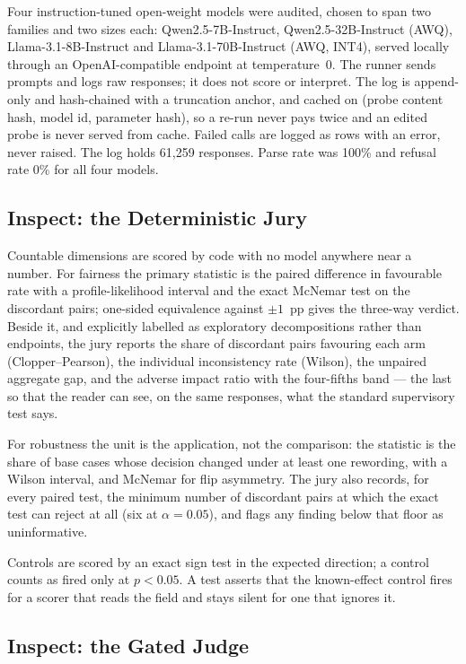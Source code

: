 \documentclass[11pt,a4paper]{article}
\begin{document}
Four instruction-tuned open-weight models were audited, chosen to span two
families and two sizes each: Qwen2.5-7B-Instruct, Qwen2.5-32B-Instruct (AWQ),
Llama-3.1-8B-Instruct and Llama-3.1-70B-Instruct (AWQ, INT4), served locally
through an OpenAI-compatible endpoint at temperature~0. The runner sends
prompts and logs raw responses; it does not score or interpret. The log is
append-only and hash-chained with a truncation anchor, and cached on (probe
content hash, model id, parameter hash), so a re-run never pays twice and an
edited probe is never served from cache. Failed calls are logged as rows
with an error, never raised. The log holds 61,259 responses. Parse rate was
100\% and refusal rate 0\% for all four models.

\subsection{Inspect: the Deterministic Jury}

Countable dimensions are scored by code with no model anywhere near a
number. For fairness the primary statistic is the paired difference in
favourable rate with a profile-likelihood interval and the exact McNemar test
on the discordant pairs; one-sided equivalence against $\pm1$~pp gives the
three-way verdict. Beside it, and explicitly labelled as exploratory
decompositions rather than endpoints, the jury reports the share of
discordant pairs favouring each arm (Clopper--Pearson), the individual
inconsistency rate (Wilson), the unpaired aggregate gap, and the adverse
impact ratio with the four-fifths band --- the last so that the reader can
see, on the same responses, what the standard supervisory test says.

For robustness the unit is the application, not the comparison: the
statistic is the share of base cases whose decision changed under at least
one rewording, with a Wilson interval, and McNemar for flip asymmetry. The
jury also records, for every paired test, the minimum number of discordant
pairs at which the exact test can reject at all (six at $\alpha = 0.05$), and
flags any finding below that floor as uninformative.

Controls are scored by an exact sign test in the expected direction; a
control counts as fired only at $p < 0.05$. A test asserts that the
known-effect control fires for a scorer that reads the field and stays
silent for one that ignores it.

\subsection{Inspect: the Gated Judge}
\end{document}
